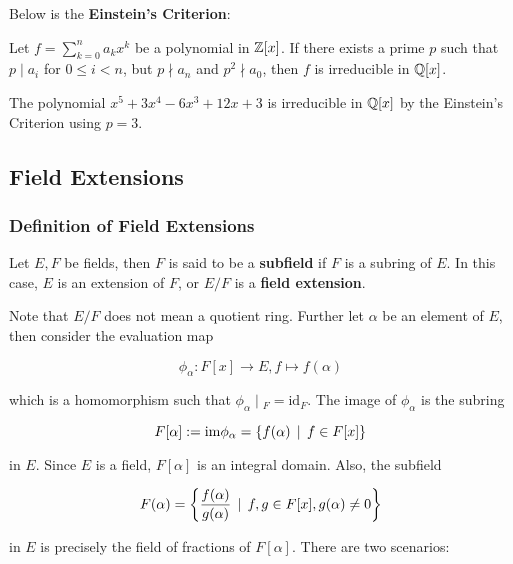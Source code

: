 \documentclass[a4paper,12pt]{article}
\begin{document}
Below is the \textbf{Einstein's Criterion}:\n

\begin{thm}
  Let $f=\sum_{k=0}^{n}a_{k}x^{k}$ be a polynomial in $\mathbb{Z}[x]$. If there exists a prime $p$ such that $p\!\mid\!a_{i}$ for $0\leq i<n$, but $p\!\nmid\!a_{n}$ and $p^{2}\!\nmid\!a_{0}$, then $f$ is irreducible in $\mathbb{Q}[x]$.
\end{thm}\n

\begin{exm}
  The polynomial $x^{5}+3x^{4}-6x^{3}+12x+3$ is irreducible in $\mathbb{Q}[x]$ by the Einstein's Criterion using $p=3$.
\end{exm}

\subsection{Field Extensions}
\subsubsection{Definition of Field Extensions}
\begin{dft}
  Let $E,F$ be fields, then $F$ is said to be a \textbf{subfield} if $F$ is a subring of $E$. In this case, $E$ is an extension of $F$, or $E/F$ is a \textbf{field extension}.
\end{dft}\n

Note that $E/F$ does not mean a quotient ring. Further let $\alpha$ be an element of $E$, then consider the evaluation map

$$\phi_{\alpha}:F[x]\to E,f\mapsto f(\alpha)$$\s

which is a homomorphism such that $\phi_{\alpha}\!\mid\!_{F}=\mathrm{id}_{F}$. The image of $\phi_{\alpha}$ is the subring

$$F[\alpha]:=\mathrm{im}\phi_{\alpha}=\left\{ f(\alpha)\,\mid\, f\in F[x]\right\}$$\s

in $E$. Since $E$ is a field, $F[\alpha]$ is an integral domain. Also, the subfield

$$F(\alpha)=\left\{ \frac{f(\alpha)}{g(\alpha)}\,\mid\, f,g\in F[x],g(\alpha)\neq 0\right\}$$\s

in $E$ is precisely the field of fractions of $F[\alpha]$. There are two scenarios:
\end{document}
